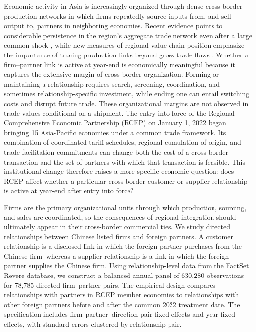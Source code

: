 \documentclass[preprint,12pt,authoryear]{elsarticle}
\begin{document}
Economic activity in Asia is increasingly organized through dense cross-border production networks in which firms repeatedly source inputs from, and sell output to, partners in neighboring economies. Recent evidence points to considerable persistence in the region's aggregate trade network even after a large common shock \citep{kiyota2022covid}, while new measures of regional value-chain position emphasize the importance of tracing production links beyond gross trade flows \citep{he2023regional}. Whether a firm--partner link is active at year-end is economically meaningful because it captures the extensive margin of cross-border organization. Forming or maintaining a relationship requires search, screening, coordination, and sometimes relationship-specific investment, while ending one can entail switching costs and disrupt future trade. These organizational margins are not observed in trade values conditional on a shipment. The entry into force of the Regional Comprehensive Economic Partnership (RCEP) on January 1, 2022 began bringing 15 Asia-Pacific economies under a common trade framework. Its combination of coordinated tariff schedules, regional cumulation of origin, and trade-facilitation commitments can change both the cost of a cross-border transaction and the set of partners with which that transaction is feasible. This institutional change therefore raises a more specific economic question: does RCEP affect whether a particular cross-border customer or supplier relationship is active at year-end after entry into force?

Firms are the primary organizational units through which production, sourcing, and sales are coordinated, so the consequences of regional integration should ultimately appear in their cross-border commercial ties. We study directed relationships between Chinese listed firms and foreign partners. A customer relationship is a disclosed link in which the foreign partner purchases from the Chinese firm, whereas a supplier relationship is a link in which the foreign partner supplies the Chinese firm. Using relationship-level data from the FactSet Revere database, we construct a balanced annual panel of 630,280 observations for 78,785 directed firm--partner pairs. The empirical design compares relationships with partners in RCEP member economies to relationships with other foreign partners before and after the common 2022 treatment date. The specification includes firm--partner--direction pair fixed effects and year fixed effects, with standard errors clustered by relationship pair.
\end{document}
